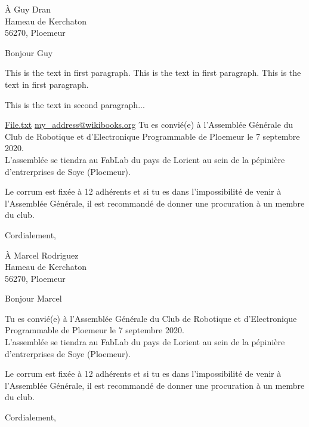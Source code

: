 \documentclass[12pt]{lettre}
\makeatletter
\newcommand{\NoRule}{\renewcommand*{\rule@length}{0}}
\makeatother
\begin{document}
   \begin{letter}{À Guy Dran\\Hameau de Kerchaton\\
               56270, Ploemeur
                  }
      
      \NoRule
      \nodate
      \nolieu%
      \address{Nicolas Le Guerroué\\20 rue du roi Arthur\\
               56270, Ploemeur}
      \nofax
      \opening{Bonjour Guy}
      
      
      This is the text in first paragraph. This is the text in first 
paragraph. This is the text in first paragraph. \par
This is the text in second paragraph...

\href{run:main.tex}{File.txt}
       \href{mailto:my_address@wikibooks.org}{my\_address@wikibooks.org}
      Tu es convié(e) à l'Assemblée Générale du Club de Robotique et d'Electronique Programmable de Ploemeur le 7 septembre 2020. \\
      
      L'assemblée se tiendra au FabLab du pays de Lorient au sein de la pépinière d'entrerprises de Soye (Ploemeur).
      
      Le corrum est fixée à 12 adhérents et si tu es dans l'impossibilité de venir à l'Assemblée Générale, il est recommandé de donner une procuration à un membre du club.
      
      \closing{Cordialement, }
     
   \end{letter}
   
   
   
   \begin{letter}{À Marcel Rodriguez\\Hameau de Kerchaton\\
               56270, Ploemeur
                  }
      \NoRule
      \nodate
      \nolieu%
      \address{Nicolas Le Guerroué\\20 rue du roi Arthur\\
               56270, Ploemeur}
      \nofax
      \opening{Bonjour Marcel}
      
      Tu es convié(e) à l'Assemblée Générale du Club de Robotique et d'Electronique Programmable de Ploemeur le 7 septembre 2020. \\
      
      L'assemblée se tiendra au FabLab du pays de Lorient au sein de la pépinière d'entrerprises de Soye (Ploemeur).
      
      Le corrum est fixée à 12 adhérents et si tu es dans l'impossibilité de venir à l'Assemblée Générale, il est recommandé de donner une procuration à un membre du club.
      
      \closing{Cordialement, }
     
   \end{letter}
   
\end{document}
